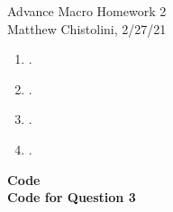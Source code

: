 \documentclass[12pt,oneside,reqno]{amsart}
\begin{document}
\begin{center}
    \Huge{Advance Macro Homework 2}\\
    \large{Matthew Chistolini, 2/27/21}
\end{center}
\vspace{-.3cm}
\begin{enumerate}
\item . \\
    
\item .\\
    
\item .\\
    
\item .\\
    
\end{enumerate}
{\Large\bf Code}\\
\textbf{Code for Question 3}

\end{document}
